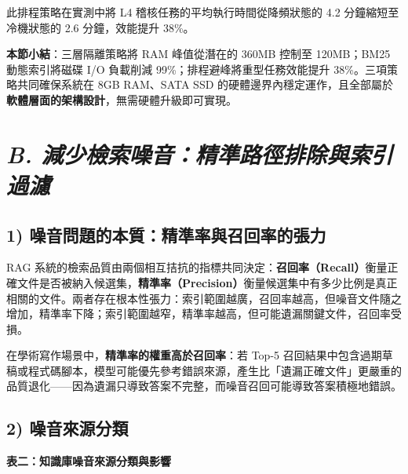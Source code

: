 此排程策略在實測中將 L4 稽核任務的平均執行時間從降頻狀態的 4.2
分鐘縮短至冷機狀態的 2.6 分鐘，效能提升 38\%。

\textbf{本節小結}：三層隔離策略將 RAM 峰值從潛在的 360MB 控制至
120MB；BM25 動態索引將磁碟 I/O 負載削減 99\%；排程避峰將重型任務效能提升
38\%。三項策略共同確保系統在 8GB RAM、SATA SSD
的硬體邊界內穩定運作，且全部屬於\textbf{軟體層面的架構設計}，無需硬體升級即可實現。

\section{\texorpdfstring{\emph{B.
減少檢索噪音：精準路徑排除與索引過濾}}{B. 減少檢索噪音：精準路徑排除與索引過濾}}\label{b.-ux6e1bux5c11ux6aa2ux7d22ux566aux97f3ux7cbeux6e96ux8defux5f91ux6392ux9664ux8207ux7d22ux5f15ux904eux6ffe}

\subsection{1)
噪音問題的本質：精準率與召回率的張力}\label{ux566aux97f3ux554fux984cux7684ux672cux8ceaux7cbeux6e96ux7387ux8207ux53ecux56deux7387ux7684ux5f35ux529b}

RAG
系統的檢索品質由兩個相互拮抗的指標共同決定：\textbf{召回率（Recall）}衡量正確文件是否被納入候選集，\textbf{精準率（Precision）}衡量候選集中有多少比例是真正相關的文件。兩者存在根本性張力：索引範圍越廣，召回率越高，但噪音文件隨之增加，精準率下降；索引範圍越窄，精準率越高，但可能遺漏關鍵文件，召回率受損。

在學術寫作場景中，\textbf{精準率的權重高於召回率}：若 Top-5
召回結果中包含過期草稿或程式碼腳本，模型可能優先參考錯誤來源，產生比「遺漏正確文件」更嚴重的品質退化------因為遺漏只導致答案不完整，而噪音召回可能導致答案積極地錯誤。

\subsection{2) 噪音來源分類}\label{ux566aux97f3ux4f86ux6e90ux5206ux985e}

\textbf{表二：知識庫噪音來源分類與影響}

